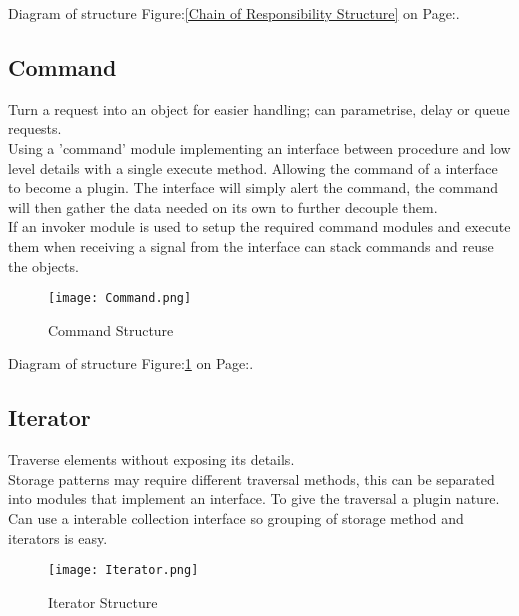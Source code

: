 \documentclass[11pt]{scrartcl} %
\begin{document}
Diagram of structure Figure:\ref{Chain of Responsibility Structure} on Page:\pageref{Chain of Responsibility Structure}.

\subsection{Command}

Turn a request into an object for easier handling; can parametrise, delay or queue requests.\\

Using a 'command' module implementing an interface between procedure and low level details 
with a single execute method. Allowing the command of a interface to become a plugin. The interface
will simply alert the command, the command will then gather the data needed on its own to further decouple them.\\

If an invoker module is used to setup the required command modules and execute them when receiving a signal from the
interface can stack commands and reuse the objects.\\

\begin{figure}[h] %
	\centering
	\texttt{[image: Command.png]} %
	\caption{Command Structure}
	\label{Command Structure}
\end{figure}

Diagram of structure Figure:\ref{Command Structure} on Page:\pageref{Command Structure}.

\subsection{Iterator}

Traverse elements without exposing its details.\\

Storage patterns may require different traversal methods, this can be separated into modules that implement an interface.
To give the traversal a plugin nature. Can use a interable collection interface so grouping of storage method and iterators is 
easy.\\

\begin{figure}[h] %
	\centering
	\texttt{[image: Iterator.png]} %
	\caption{Iterator Structure}
	\label{Iterator Structure}
\end{figure}
\end{document}
